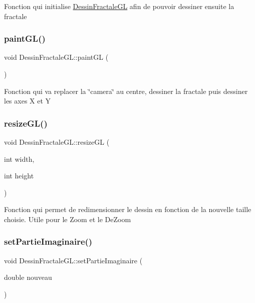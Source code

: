 Fonction qui initialise \hyperlink{classDessinFractaleGL}{Dessin\+Fractale\+GL} afin de pouvoir dessiner ensuite la fractale \mbox{\label{classDessinFractaleGL_a75f2da3d7df21b06d387f92752cb7c29}} 
\subsubsection{\texorpdfstring{paint\+G\+L()}{paintGL()}}
{\footnotesize\ttfamily void Dessin\+Fractale\+G\+L\+::paint\+GL (\begin{DoxyParamCaption}{ }\end{DoxyParamCaption})}

Fonction qui va replacer la \char`\"{}camera\char`\"{} au centre, dessiner la fractale puis dessiner les axes X et Y \mbox{\label{classDessinFractaleGL_a710489754151a61fce818fab53850f3b}} 
\subsubsection{\texorpdfstring{resize\+G\+L()}{resizeGL()}}
{\footnotesize\ttfamily void Dessin\+Fractale\+G\+L\+::resize\+GL (\begin{DoxyParamCaption}\item[{int}]{width,  }\item[{int}]{height }\end{DoxyParamCaption})}

Fonction qui permet de redimensionner le dessin en fonction de la nouvelle taille choisie. Utile pour le Zoom et le De\+Zoom \mbox{\label{classDessinFractaleGL_aa8c8e1c831c90d0f669963d18de384fa}} 
\subsubsection{\texorpdfstring{set\+Partie\+Imaginaire()}{setPartieImaginaire()}}
{\footnotesize\ttfamily void Dessin\+Fractale\+G\+L\+::set\+Partie\+Imaginaire (\begin{DoxyParamCaption}\item[{double}]{nouveau }\end{DoxyParamCaption})}


